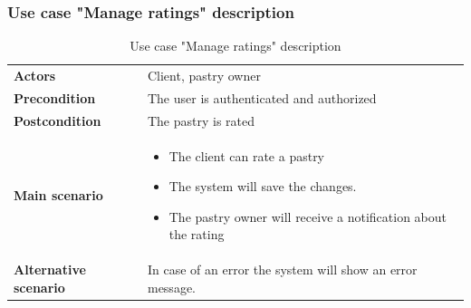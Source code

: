 \documentclass[12pt,a4paper]{report}
\begin{document}
	\subsubsection*{Use case "Manage ratings" description}
	\begin{table}[H]
		\begin{center}
			\captionsetup[table]{skip=10pt}
			\caption{Use case "Manage ratings" description}
			\setlength\doublerulesep{0.5pt}
			\begin{tabular}{|  p{5cm}|  p{9cm}|}
				\rowcolor{LightCyan}
				
				\hline
				\multicolumn{2}{c}{Use case "Manage ratings"}\\
				\hline
				
				\textbf{Actors} &                        
				Client, pastry owner 
				\\ \hline
				
				\textbf{Precondition} &                        
				The user is authenticated and authorized
				\\ \hline
				\textbf{Postcondition} &                        
				The pastry is rated
				\\ \hline
				
				\textbf{Main scenario} &                   
				\begin{itemize}
					\item The client can rate a pastry
					\item The system will save the changes.
					\item The pastry owner will receive a notification about the rating
				\end{itemize}
				
				
				\\ \hline
				
				\textbf{Alternative scenario} &                        
				In case of an error the system will show an error message.
				\\ \hline
				
				
			\end{tabular}
			
		\end{center}
		
	\end{table}
\end{document}
